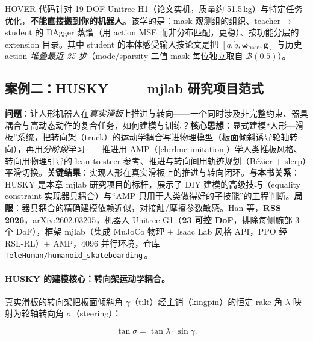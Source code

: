 \begin{note}
HOVER 代码针对 19-DOF Unitree H1（论文实机，质量约 51.5\,kg）与特定任务优化，\textbf{不能直接搬到你的机器人}。该学的是：mask 观测组的组织、teacher$\to$student 的 DAgger 蒸馏（用 action MSE 而非分布匹配，更稳）、按功能分层的 extension 目录。其中 student 的本体感受输入按论文是把 $[q,\dot q,\boldsymbol\omega_{\text{base}},\mathbf{g}]$ 与历史 action \emph{堆叠最近 25 步}（mode/sparsity 二值 mask 每位独立取自 $\mathcal{B}(0.5)$）。
\end{note}

\subsection{案例二：HUSKY —— mjlab 研究项目范式}
\label{sec:rlmc-diy-husky}

\begin{paper}\label{paper:rlmc-diy-husky}
\textbf{问题}：让人形机器人在\emph{真实滑板}上推进与转向——一个同时涉及非完整约束、器具耦合与高动态动作的复合任务，如何建模与训练？\textbf{核心思想}：显式建模“人形—滑板”系统，把转向架（truck）的运动学耦合写进物理模型（板面倾斜诱导轮轴转向），再用\emph{分阶段}学习——推进用 AMP（\cref{ch:rlmc-imitation}）学人类推板风格、转向用物理引导的 lean-to-steer 参考、推进与转向间用轨迹规划（Bézier + slerp）平滑切换。\textbf{关键结果}：实现人形在真实滑板上的推进与转向闭环。\textbf{与本书关系}：HUSKY 是本章 mjlab 研究项目的标杆，展示了 DIY 建模的高级技巧（equality constraint 实现器具耦合）与“AMP 只用于人类做得好的子技能”的工程判断。\textbf{局限}：器具耦合的精确建模依赖近似，对接触/摩擦参数敏感。Han 等，\textbf{RSS 2026}，arXiv:2602.03205，机器人 Unitree G1（\textbf{23 可控 DoF}，排除每侧腕部 3 个 DoF），框架 mjlab（集成 MuJoCo 物理 $+$ Isaac Lab 风格 API，PPO 经 RSL-RL）$+$ AMP，4096 并行环境，仓库 \texttt{TeleHuman/humanoid\_skateboarding}\,\cite{husky2026}。
\end{paper}

\paragraph{HUSKY 的建模核心：转向架运动学耦合。}真实滑板的转向架把板面倾斜角 $\gamma$（tilt）经主销（kingpin）的恒定 rake 角 $\lambda$ 映射为轮轴转向角 $\sigma$（steering）：

\begin{equation}
\tan\sigma = \tan\lambda \cdot \sin\gamma.
\label{eq:rlmc-diy-kingpin}
\end{equation}

